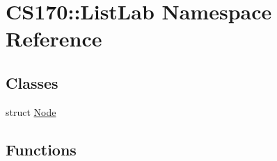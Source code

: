 \hypertarget{namespace_c_s170_1_1_list_lab}{\section{C\-S170\-:\-:List\-Lab Namespace Reference}
\label{namespace_c_s170_1_1_list_lab}
}
\subsection*{Classes}
\begin{DoxyCompactItemize}
\item 
struct \hyperlink{struct_c_s170_1_1_list_lab_1_1_node}{Node}
\end{DoxyCompactItemize}
\subsection*{Functions}
